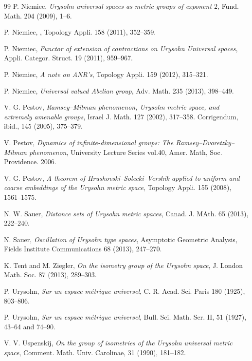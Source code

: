 \documentclass[leqno, 12pt]{jsarticle}
\begin{document}
\begin{thebibliography}{99}
P. Niemiec, 
\textit{Urysohn universal spaces as metric groups of exponent $2$}, 
Fund. Math. 204 (2009), 1--6. 

P. Niemiec, 
, 
Topology Appli. 158 (2011), 352--359. 

P. Niemiec, 
\textit{Functor of extension of contractions on Urysohn Universal spaces}, 
Appli. Categor. Struct. 19 (2011), 959--967. 


P. Niemiec, 
\textit{A note on ANR's}, 
Topology Appli. 
159 (2012), 315--321. 


P. Niemiec, 
\textit{Universal valued Abelian group}, 
Adv.  Math. 235 (2013), 398--449. 


V. G. Pestov, 
\textit{Ramsey--Milman phenomenon, Urysohn metric space, and extremely amenable groups}, 
Israel J.  Math.  127 (2002), 
317--358. 
Corrigendum, ibid., 145 (2005), 375--379. 




V. Pestov, 
\textit{Dynamics of infinite-dimensional groups: The Ramsey--Dvoretzky--Milman phenomenon}, 
University Lecture Series vol.40, 
Amer. Math, Soc. Providence. 2006. 

V. G. Pestov, 
\textit{A theorem of Hrushovski--Solecki--Vershik applied to uniform 
and coarse embeddings of the Urysohn metric space}, 
Topology Appli. 155 (2008), 1561--1575. 




N. W. Sauer, 
\textit{Distance sets of Urysohn metric spaces}, 
Canad. J. MAth. 65 (2013), 222--240. 

N. Sauer, 
\textit{Oscillation of Urysohn type spaces}, Asymptotic Geometric Analysis, 
Fields Institute Communications 68 (2013), 247--270. 


K. Tent and M. Ziegler, 
\textit{On the isometry group of the Urysohn space}, 
J. London Math. Soc. 87 (2013), 289--303. 


P. Urysohn, 
\textit{Sur un espace m\'etrique universel}, 
C. R. Acad. Sci. Paris 180 (1925), 
803--806. 


P. Urysohn, 
\textit{Sur un espace m\'etrique universel}, 
Bull. Sci. Math. Ser. II,  51 (1927), 
43--64 and 74--90. 


V. V. Uspenskij, 
\textit{On the group of isometries of the Urysohn universal metric space}, 
Comment. Math. Univ. Carolinae, 
31 (1990), 181--182. 



\end{thebibliography}
\end{document}
